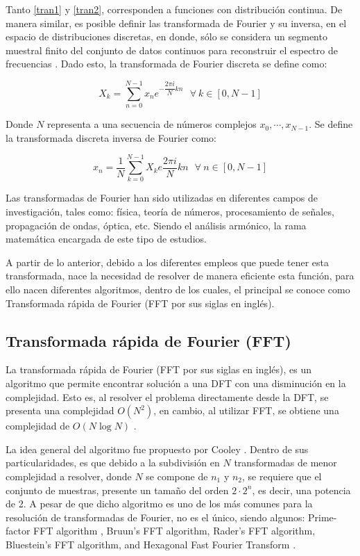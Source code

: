Tanto \ref{tran1} y \ref{tran2}, corresponden a funciones con distribución continua. De manera similar, es posible definir las transformada de Fourier y su inversa, en el espacio de distribuciones discretas, en donde, sólo se considera un segmento muestral finito del conjunto de datos continuos para reconstruir el espectro de frecuencias \cite{rao2014discrete}. Dado esto, la transformada de Fourier discreta se define como:

\begin{equation}
	X_k = \sum_{n=0}^{N-1} x_n e^{-\dfrac{2\pi i}{N} kn}\ \ \  \forall\  k \in [0, N-1]
\end{equation} 

Donde $N$ representa a una secuencia de números complejos $x_0, \cdots, x_{N-1}$. Se define la transformada discreta inversa de Fourier como:

\begin{equation}
	x_n = \dfrac{1}{N} \sum_{k=0}^{N-1} X_k e \dfrac{2\pi i}{N} kn \ \ \ \forall \ n \in [0, N-1]
\end{equation}

Las transformadas de Fourier han sido utilizadas en diferentes campos de investigación, tales como: física, teoría de números, procesamiento de señales, propagación de ondas, óptica, etc. Siendo el análisis armónico, la rama matemática encargada de este tipo de estudios.

A partir de lo anterior, debido a los diferentes empleos que puede tener esta transformada, nace la necesidad de resolver de manera eficiente esta función, para ello nacen diferentes algoritmos, dentro de los cuales, el principal se conoce como Transformada rápida de Fourier (FFT por sus siglas en inglés).
 
\subsection{Transformada rápida de Fourier (FFT)}

La transformada rápida de Fourier (FFT por sus siglas en inglés), es un algoritmo que permite encontrar solución a una DFT con una disminución en la complejidad. Esto es, al resolver el problema directamente desde la DFT, se presenta una complejidad $O(N^2)$, en cambio, al utilizar FFT, se obtiene una complejidad de $O(N\log N)$ \cite{welch1967use}.

La idea general del algoritmo fue propuesto por Cooley \cite{cooley1970fast}. Dentro de sus particularidades, es que debido a la subdivisión en $N$ transformadas de menor complejidad a resolver, donde $N$ se compone de $n_1$ y $n_2$, se requiere que el conjunto de muestras, presente un tamaño del orden $2\cdot 2^n$, es decir, una potencia de 2. A pesar de que dicho algoritmo es uno de los más comunes para la resolución de transformadas de Fourier, no es el único, siendo algunos: Prime-factor FFT algorithm \cite{kolba1977prime}, Bruun's FFT algorithm, Rader's FFT algorithm, Bluestein's FFT algorithm, and Hexagonal Fast Fourier Transform \cite{cui2005some}.

